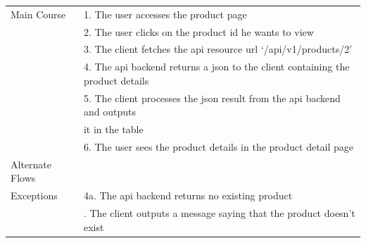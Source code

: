 \documentclass{report}
\begin{document}
\begin{tabular}{ l l }
Main Course			& 1. The user accesses the product page \\
					& 2. The user clicks on the product id he wants to view \\
					& 3. The client fetches the api resource url ‘/api/v1/products/2’ \\ 
					& 4. The api backend returns a json to the client containing the product details \\ 
					& 5. The client processes the json result from the api backend and outputs \\
					& it in the table \\
					& 6. The user sees the product details in the product detail page \\
Alternate Flows		& \\
Exceptions 			& 4a. The api backend returns no existing product \\
					& \qquad 1. The client outputs a message saying that the product doesn’t exist \\

\end{tabular}
\newpage
\end{document}
